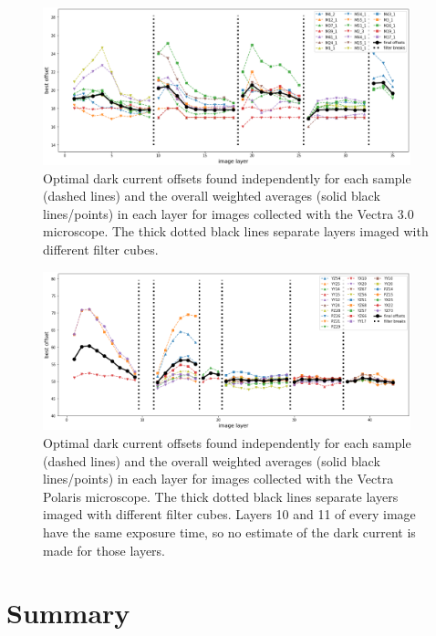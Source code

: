 \documentclass[letterpaper,11pt]{article}
\begin{document}
\begin{figure}[!ht]
\centering
\includegraphics[width=0.95\textwidth]{images/results/dark_current_offsets_vectra}
\caption{\footnotesize Optimal dark current offsets found independently for each sample (dashed lines) and the overall weighted averages (solid black lines/points) in each layer for images collected with the Vectra 3.0 microscope. The thick dotted black lines separate layers imaged with different filter cubes.}
\label{fig:dark_current_offsets_vectra}
\end{figure}

\begin{figure}[!ht]
\centering
\includegraphics[width=0.95\textwidth]{images/results/dark_current_offsets_polaris}
\caption{\footnotesize Optimal dark current offsets found independently for each sample (dashed lines) and the overall weighted averages (solid black lines/points) in each layer for images collected with the Vectra Polaris microscope. The thick dotted black lines separate layers imaged with different filter cubes. Layers 10 and 11 of every image have the same exposure time, so no estimate of the dark current is made for those layers.}
\label{fig:dark_current_offsets_polaris}
\end{figure}

\section{Summary}
\label{sec:summary}

\clearpage

\end{document}
